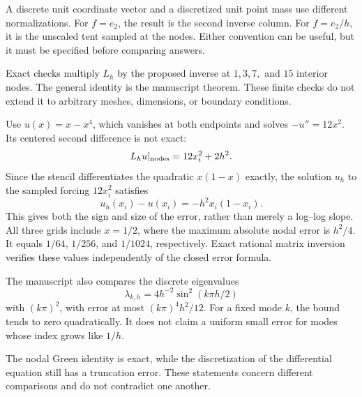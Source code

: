 A discrete unit coordinate vector and a discretized unit point mass use different normalizations. For $f=e_2$, the result is the second inverse column. For $f=e_2/h$, it is the unscaled tent sampled at the nodes. Either convention can be useful, but it must be specified before comparing answers.

Exact checks multiply $L_h$ by the proposed inverse at $1,3,7,$ and $15$ interior nodes. The general identity is the manuscript theorem. These finite checks do not extend it to arbitrary meshes, dimensions, or boundary conditions.

Use $u(x)=x-x^4$, which vanishes at both endpoints and solves $-u''=12x^2$. Its centered second difference is not exact:
\[
L_hu|_{\rm nodes}=12x_i^2+2h^2.
\]
Since the stencil differentiates the quadratic $x(1-x)$ exactly, the solution $u_h$ to the sampled forcing $12x_i^2$ satisfies
\[
\boxed{u_h(x_i)-u(x_i)=-h^2x_i(1-x_i).}
\]
This gives both the sign and size of the error, rather than merely a log--log slope.
All three grids include $x=1/2$, where the maximum absolute nodal error is $h^2/4$. It equals $1/64$, $1/256$, and $1/1024$, respectively. Exact rational matrix inversion verifies these values independently of the closed error formula.

The manuscript also compares the discrete eigenvalues
\[
\lambda_{k,h}=4h^{-2}\sin^2(k\pi h/2)
\]
with $(k\pi)^2$, with error at most $(k\pi)^4h^2/12$. For a fixed mode $k$, the bound tends to zero quadratically. It does not claim a uniform small error for modes whose index grows like $1/h$.

The nodal Green identity is exact, while the discretization of the differential equation still has a truncation error. These statements concern different comparisons and do not contradict one another.

